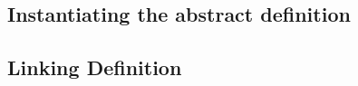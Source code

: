 




\subsection{Instantiating the abstract definition}
\label{subsec:instantiate-mc}



\subsection{Linking Definition}
\label{subsec:optimization-mc}
